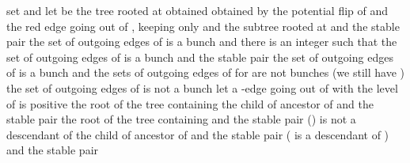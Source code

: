 \documentclass[11pt,a4paper]{article}
\begin{document}
\begin{small}
\begin{codebox}
\li      set  and 
\li      
\li       let  be the tree rooted at  obtained obtained by the potential flip of 
\zi and the red edge going out of , keeping only  and the subtree rooted at 
\li        \If      
\li             \Then {}   
\li                   \Return  and the stable pair  
                \End
\li         \If  
\li             \Then {} 
\li                   {} 
\li                    \Return  {} 
                 \End
\li        \If  
\li              \Then \If the set of outgoing edges of  is a bunch and there is an 
\zi     integer  such that the set of outgoing edges of  is a bunch
\li                       \Then \Return  and the stable pair  
                          \End
\li                     \If the set of outgoing edges of  is a bunch 
\zi                            and the sets of outgoing edges of  for  are not bunches
\label{li:FlipEdgesChildren-cluster4-debut} 
\li                        \Then   
\li                                        {} (we still have ) \label{li:FlipEdgesChildren-cluster4-fin}
\li                                         \Return 
                           \End
\li                     \If the set of outgoing edges of  is not a bunch 
\li                          \Then let  a -edge going out of  with 
\li                                \If   
\li                                    \Then 
\li                                         \If  the level of  is positive
\li                                              \Then  the root of the tree containing 
\li                                                     
\li                                                      the child of  ancestor of 
\li                                                     \Return  and the stable pair  
\li                                              \Else  the root of the tree containing 
\li                                                     
\li                                                     \Return  and the stable pair  
                                                  \End
\li                                    \Else () 
\li                                         \If  is not a descendant of 
\li                                          \Then  
\li                                                     
\li                                                  the child of  ancestor of 
\li                                                 \Return  and the stable pair  
\li                                           \Else ( is a descendant of )
\li                                                 
\li                                                     
\li                                                 \Return  and the stable pair  
                                              \End
                                       \End 
                            \End
           \End
\end{codebox}
\end{small}
\end{document}
